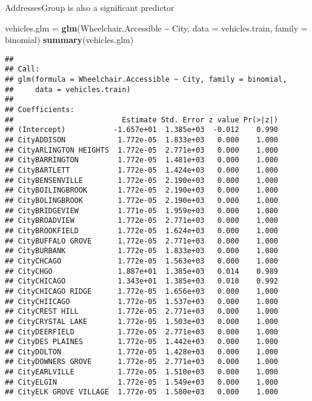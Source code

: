 \documentclass[
]{article}
\newenvironment{Shaded}{\begin{snugshade}}{\end{snugshade}}
\newcommand{\AttributeTok}[1]{\textcolor[rgb]{0.13,0.29,0.53}{#1}}
\newcommand{\FunctionTok}[1]{\textcolor[rgb]{0.13,0.29,0.53}{\textbf{#1}}}
\newcommand{\NormalTok}[1]{#1}
\newcommand{\OtherTok}[1]{\textcolor[rgb]{0.56,0.35,0.01}{#1}}
\newcommand{\SpecialCharTok}[1]{\textcolor[rgb]{0.81,0.36,0.00}{\textbf{#1}}}
\begin{document}
AddressesGroup is also a significant predictor

\begin{Shaded}
\begin{Highlighting}[]
\NormalTok{vehicles.glm }\OtherTok{=} \FunctionTok{glm}\NormalTok{(Wheelchair.Accessible }\SpecialCharTok{\textasciitilde{}}\NormalTok{ City, }\AttributeTok{data =}\NormalTok{ vehicles.train, }
                   \AttributeTok{family =}\NormalTok{ binomial)}
\FunctionTok{summary}\NormalTok{(vehicles.glm)}
\end{Highlighting}
\end{Shaded}

\begin{verbatim}
## 
## Call:
## glm(formula = Wheelchair.Accessible ~ City, family = binomial, 
##     data = vehicles.train)
## 
## Coefficients:
##                         Estimate Std. Error z value Pr(>|z|)
## (Intercept)           -1.657e+01  1.385e+03  -0.012    0.990
## CityADDISON            1.772e-05  1.833e+03   0.000    1.000
## CityARLINGTON HEIGHTS  1.772e-05  2.771e+03   0.000    1.000
## CityBARRINGTON         1.772e-05  1.481e+03   0.000    1.000
## CityBARTLETT           1.772e-05  1.424e+03   0.000    1.000
## CityBENSENVILLE        1.772e-05  2.190e+03   0.000    1.000
## CityBOILINGBROOK       1.772e-05  2.190e+03   0.000    1.000
## CityBOLINGBROOK        1.772e-05  2.190e+03   0.000    1.000
## CityBRIDGEVIEW         1.771e-05  1.959e+03   0.000    1.000
## CityBROADVIEW          1.772e-05  2.771e+03   0.000    1.000
## CityBROOKFIELD         1.772e-05  1.624e+03   0.000    1.000
## CityBUFFALO GROVE      1.772e-05  2.771e+03   0.000    1.000
## CityBURBANK            1.772e-05  1.833e+03   0.000    1.000
## CityCHCAGO             1.772e-05  1.563e+03   0.000    1.000
## CityCHGO               1.887e+01  1.385e+03   0.014    0.989
## CityCHICAGO            1.343e+01  1.385e+03   0.010    0.992
## CityCHICAGO RIDGE      1.772e-05  1.656e+03   0.000    1.000
## CityCHIICAGO           1.772e-05  1.537e+03   0.000    1.000
## CityCREST HILL         1.772e-05  2.771e+03   0.000    1.000
## CityCRYSTAL LAKE       1.772e-05  1.503e+03   0.000    1.000
## CityDEERFIELD          1.772e-05  2.771e+03   0.000    1.000
## CityDES PLAINES        1.772e-05  1.442e+03   0.000    1.000
## CityDOLTON             1.772e-05  1.428e+03   0.000    1.000
## CityDOWNERS GROVE      1.772e-05  2.771e+03   0.000    1.000
## CityEARLVILLE          1.772e-05  1.510e+03   0.000    1.000
## CityELGIN              1.772e-05  1.549e+03   0.000    1.000
## CityELK GROVE VILLAGE  1.772e-05  1.580e+03   0.000    1.000

\end{verbatim}
\end{document}
